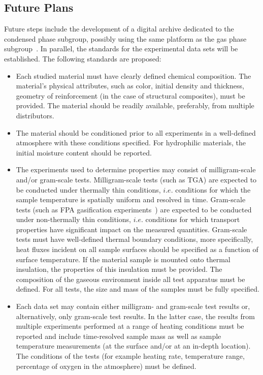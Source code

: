 
\subsection{Future Plans} \label{sec:CPS_session_3}

Future steps include the development of a digital archive dedicated to the condensed phase subgroup, possibly using the same platform as the gas phase subgroup~\cite{MaCFP_repository}.  In parallel, the standards for the experimental data sets will be established.  The following standards are proposed:

\begin{itemize}
\item Each studied material must have clearly defined chemical composition.  The material's physical attributes, such as color, initial density and thickness, geometry of reinforcement (in the case of structural composites), must be provided.  The material should be readily available, preferably, from multiple distributors.
\item The material should be conditioned prior to all experiments in a well-defined atmosphere with these conditions specified.  For hydrophilic materials, the initial moisture content should be reported.
\item The experiments used to determine properties may consist of milligram-scale and/or gram-scale tests.  Milligram-scale tests (such as TGA) are expected to be conducted under thermally thin conditions, $i.e.$ conditions for which the sample temperature is spatially uniform and resolved in time.  Gram-scale tests (such as FPA gasification experiments~\cite{Chaos:2011}) are expected to be conducted under non-thermally thin conditions, $i.e.$ conditions for which transport properties have significant impact on the measured quantities.  Gram-scale tests must have well-defined thermal boundary conditions, more specifically, heat fluxes incident on all sample surfaces should be specified as a function of surface temperature.  If the material sample is mounted onto thermal insulation, the properties of this insulation must be provided.  The composition of the gaseous environment inside all test apparatus must be defined. For all tests, the size and mass of the samples must be fully specified.
\item Each data set may contain either milligram- and gram-scale test results or, alternatively, only gram-scale test results.  In the latter case, the results from multiple experiments performed at a range of heating conditions must be reported and include time-resolved sample mass as well as sample temperature measurements (at the surface and/or at an in-depth location). The conditions of the tests (for example heating rate, temperature range, percentage of oxygen in the atmosphere) must be defined.

\end{itemize}
